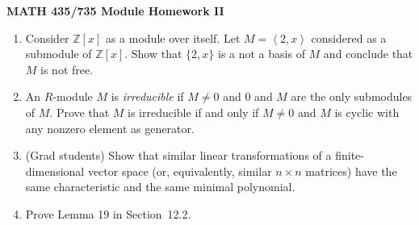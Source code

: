 \documentclass[11pt]{article}
\newcommand\gen[1]{\left< #1 \right>}
\def\Z{\mathbb{Z}}
\begin{document}
\setlength{\parindent}{0pt}
\setlength{\parskip}{0.4cm}

\thispagestyle{empty} 

\begin{center} {\bf MATH 435/735 \qquad \qquad Module Homework II} \end{center} 

\begin{enumerate}[(1)]

\item Consider $\Z[x]$ as a module over itself.
Let $M = \gen{2, x}$ considered as a submodule of $\Z[x]$.
Show that $\{ 2, x \}$ is a not a basis of $M$ and conclude that $M$ is not free.

\item An $R$-module $M$ is \emph{irreducible} if $M \ne 0$ and $0$ and $M$ are the only submodules of $M$.
Prove that $M$ is irreducible if and only if $M \ne 0$ and $M$ is cyclic with any nonzero element as generator.

\item (Grad students)
Show that similar linear transformations of a finite-dimensional vector space (or, equivalently, similar $n \times n$ matrices) have the same characteristic and the same
minimal polynomial.

\item Prove Lemma 19 in Section~12.2.

\end{enumerate}
\end{document}
